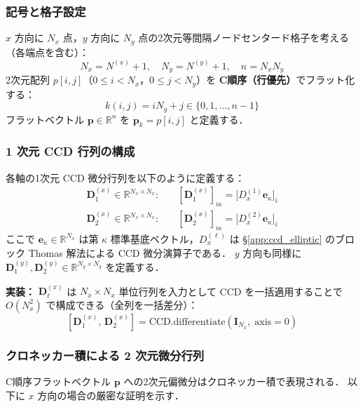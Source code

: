 \subsubsection{記号と格子設定}

$x$ 方向に $N_x$ 点，$y$ 方向に $N_y$ 点の2次元等間隔ノードセンタード格子を考える（各端点を含む）：
\[
  N_x = N^{(x)}+1,\quad N_y = N^{(y)}+1,\quad n = N_x N_y
\]
2次元配列 $p[i,j]$（$0 \le i < N_x$，$0 \le j < N_y$）を \textbf{C順序（行優先）}でフラット化する：
\begin{equation}
  k(i,j) = i N_y + j \in \{0, 1, \dots, n-1\}
  \label{eq:c_order_index}
\end{equation}
フラットベクトル $\bm{p} \in \mathbb{R}^n$ を $\bm{p}_k = p[i,j]$ と定義する．

\subsubsection{1 次元 CCD 行列の構成}

各軸の1次元 CCD 微分行列を以下のように定義する：
\begin{align}
  \mathbf{D}_1^{(x)} \in \mathbb{R}^{N_x \times N_x}: &\quad
    [\mathbf{D}_1^{(x)}]_{i\kappa} = \bigl[D_x^{(1)}\mathbf{e}_\kappa\bigr]_i
    \label{eq:D1x_def} \\
  \mathbf{D}_2^{(x)} \in \mathbb{R}^{N_x \times N_x}: &\quad
    [\mathbf{D}_2^{(x)}]_{i\kappa} = \bigl[D_x^{(2)}\mathbf{e}_\kappa\bigr]_i
    \label{eq:D2x_def}
\end{align}
ここで $\mathbf{e}_\kappa \in \mathbb{R}^{N_x}$ は第 $\kappa$ 標準基底ベクトル，$D_x^{(\ell)}$ は
§\ref{app:ccd_elliptic} のブロック Thomas 解法による CCD 微分演算子である．
$y$ 方向も同様に $\mathbf{D}_1^{(y)}, \mathbf{D}_2^{(y)} \in \mathbb{R}^{N_y \times N_y}$ を定義する．

\noindent\textbf{実装：} $\mathbf{D}_\ell^{(x)}$ は $N_x \times N_x$ 単位行列を入力として CCD を一括適用することで
$O(N_x^2)$ で構成できる（全列を一括差分）：
\[
  [\mathbf{D}_1^{(x)},\, \mathbf{D}_2^{(x)}] = \mathrm{CCD.differentiate}(\mathbf{I}_{N_x},\;\mathrm{axis}=0)
\]

\subsubsection{クロネッカー積による 2 次元微分行列}

C順序フラットベクトル $\bm{p}$ への2次元偏微分はクロネッカー積で表現される．
以下に $x$ 方向の場合の厳密な証明を示す．


